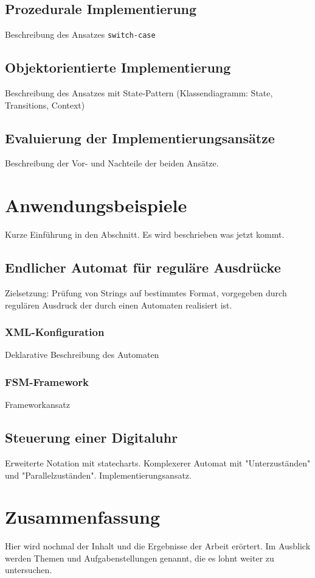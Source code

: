 \documentclass[fleqn,10pt,ngerman]{SelfArx}
\begin{document}
\subsection{Prozedurale Implementierung}
Beschreibung des Ansatzes \texttt{switch-case}


\subsection{Objektorientierte Implementierung}
Beschreibung des Ansatzes mit State-Pattern (Klassendiagramm: State, Transitions, Context)

\subsection{Evaluierung der Implementierungsansätze}
Beschreibung der Vor- und Nachteile der beiden Ansätze.

\section{Anwendungsbeispiele}
Kurze Einführung in den Abschnitt. Es wird beschrieben was jetzt kommt.

\subsection{Endlicher Automat für reguläre Ausdrücke}
Zielsetzung: Prüfung von Strings auf bestimmtes Format, vorgegeben durch regulären Ausdruck der
durch einen Automaten realisiert ist.

\subsubsection{XML-Konfiguration}
Deklarative Beschreibung des Automaten

\subsubsection{FSM-Framework}
Frameworkansatz

\subsection{Steuerung einer Digitaluhr}
Erweiterte Notation mit statecharts. 
Komplexerer Automat mit "Unterzuständen" und "Parallelzuständen".
Implementierungsansatz.


\section{Zusammenfassung}
Hier wird nochmal der Inhalt und die Ergebnisse der Arbeit erörtert. Im Ausblick werden Themen und Aufgabenstellungen genannt, die es lohnt weiter zu untersuchen.
\end{document}
